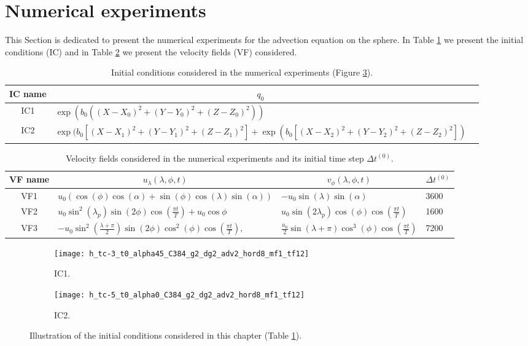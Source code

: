 \section{Numerical experiments}
\label{chp-cs-numexpadv}
This Section is dedicated to present the numerical experiments for the
advection equation on the sphere. In Table \ref{chp5-tab1} we present
the initial conditions (IC) and in Table \ref{chp5-tab2} we present
the velocity fields (VF) considered.
\begin{table}[!ht]
	\begin{tabular}{|c|l|l|}
		\hline
		IC name & \multicolumn{1}{c|}{$q_0$} \\ \hline
		IC1   & $\exp(b_0((X-X_0)^2+ (Y-Y_0)^2 + (Z-Z_0)^2))$ \\ \hline
		IC2   & $\exp(b_0[(X-X_1)^2+ (Y-Y_1)^2 + (Z-Z_1)^2] + \exp(b_0[(X-X_2)^2+ (Y-Y_2)^2 + (Z-Z_2)^2])$ \\ \hline
	\end{tabular}
	\caption{Initial conditions considered in the numerical experiments (Figure \ref{chp5-ic}).}
	\label{chp5-tab1} 
\end{table}

\begin{table}[!ht]
	\begin{tabular}{|c|l|l|l|}
		\hline
		VF name & \multicolumn{1}{c|}{$u_\lambda(\lambda,\phi,t) $} & \multicolumn{1}{c|}{$v_\phi(\lambda,\phi,t)$}  & \multicolumn{1}{c|}{$\Delta t^{(0)}$}\\ \hline
		VF1   & $u_0(\cos(\phi)\cos(\alpha) + \sin(\phi)\cos(\lambda)\sin(\alpha))$ 
		& $-u_0\sin(\lambda)\sin(\alpha)$ & 3600  \\ \hline
		VF2   & $u_0\sin^2(\lambda_p)\sin(2\phi)\cos(\frac{\pi t}{T})+u_0\cos\phi$ 
		& $u_0\sin(2\lambda_p)\cos(\phi)\cos(\frac{\pi t}{T})$& 1600  \\ \hline
		VF3   & $-u_0\sin^2(\frac{\lambda+\pi}{2})\sin(2\phi)\cos^2(\phi)\cos(\frac{\pi t}{T}),$ 
		& $\frac{u_0}{2}\sin(\lambda+\pi)\cos^3(\phi)\cos(\frac{\pi t}{T})$ & 7200 \\ \hline
	\end{tabular}
	\caption{Velocity fields considered in the numerical experiments and its initial time step $\Delta t^{(0)}$.}
	\label{chp5-tab2}
\end{table}
\begin{figure}[!htb]
	\centering
	\begin{subfigure}{0.45\textwidth}
		\centering
		\texttt{[image: h\_tc-3\_t0\_alpha45\_C384\_g2\_dg2\_adv2\_hord8\_mf1\_tf12]}
		\caption{IC1. \label{chp5-ic1}}
	\end{subfigure}
	\begin{subfigure}{0.45\textwidth}
		\centering
		\texttt{[image: h\_tc-5\_t0\_alpha0\_C384\_g2\_dg2\_adv2\_hord8\_mf1\_tf12]}
		\caption{IC2. \label{chp5-ic2}}
	\end{subfigure}
	\caption{ Illustration of the initial conditions considered in this chapter (Table \ref{chp5-tab1}).\label{chp5-ic}}
\end{figure}


